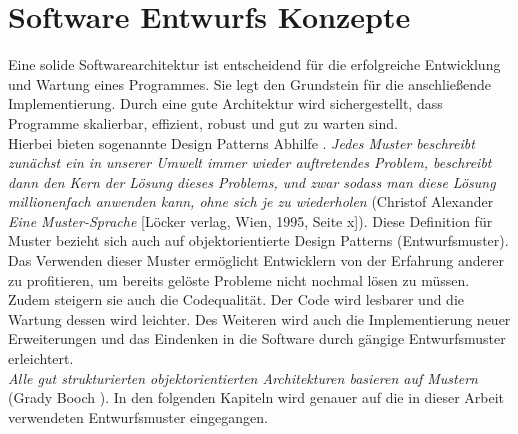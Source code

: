 \section{Software Entwurfs Konzepte}
Eine solide Softwarearchitektur ist entscheidend für die erfolgreiche Entwicklung und Wartung eines Programmes. Sie legt den Grundstein für die anschließende Implementierung. Durch eine gute Architektur wird sichergestellt, dass Programme skalierbar, effizient, robust und gut zu warten sind.\\
Hierbei bieten sogenannte Design Patterns Abhilfe \cite{DesignPatterns}. \glqq\textit{Jedes Muster beschreibt zunächst ein in unserer Umwelt immer wieder auftretendes Problem, beschreibt dann den Kern der Lösung dieses Problems, und zwar sodass man diese Lösung millionenfach anwenden kann, ohne sich je zu wiederholen}\grqq{} (Christof Alexander \textit{Eine Muster-Sprache} [Löcker verlag, Wien, 1995, Seite x]). Diese Definition für Muster bezieht sich auch auf objektorientierte Design Patterns (Entwurfsmuster). Das Verwenden dieser Muster ermöglicht Entwicklern von der Erfahrung anderer zu profitieren, um bereits gelöste Probleme nicht nochmal lösen zu müssen. Zudem steigern sie auch die Codequalität. Der Code wird lesbarer und die Wartung dessen wird leichter. Des Weiteren wird auch die Implementierung neuer Erweiterungen und das Eindenken in die Software durch gängige Entwurfsmuster erleichtert. \cite[S.25 ff]{DesignPatterns}\\
\glqq\textit{Alle gut strukturierten objektorientierten Architekturen basieren auf Mustern}\grqq{} (Grady Booch \cite[S.21]{DesignPatterns}).
In den folgenden Kapiteln wird genauer auf die in dieser Arbeit verwendeten Entwurfsmuster eingegangen.      


